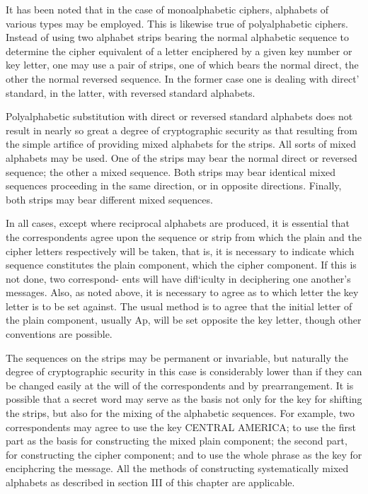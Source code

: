 \mypara It has been noted that in the case of monoalphabetic ciphers, alphabets of various types may be employed. This is likewise true of polyalphabetic ciphers. Instead of using two alphabet strips bearing the
normal alphabetic sequence to determine the cipher equivalent of a letter
enciphered by a given key number or key letter, one may use a pair of
strips, one of which bears the normal direct, the other the normal reversed
sequence. In the former case one is dealing with direct' standard, in the
latter, with reversed standard alphabets.

\mypara Polyalphabetic substitution with direct or reversed standard alphabets does not result in nearly so great a degree of cryptographic security
as that resulting from the simple artiﬁce of providing mixed alphabets
for the strips. All sorts of mixed alphabets may be used. One of the
strips may bear the normal direct or reversed sequence; the other a
mixed sequence. Both strips may bear identical mixed sequences proceeding in the same direction, or in opposite directions. Finally, both strips
may bear different mixed sequences.

\mypara In all cases, except where reciprocal alphabets are produced, it is
essential that the correspondents agree upon the sequence or strip from
which the plain and the cipher letters respectively will be taken, that is,
it is necessary to indicate which sequence constitutes the plain component, which the cipher component. If this is not done, two correspond-
ents will have diﬂ‘iculty in deciphering one another’s messages. Also, as
noted above, it is necessary to agree as to which letter the key letter is to
be set against. The usual method is to agree that the initial letter of the
plain component, usually Ap, will be set opposite the key letter, though
other conventions are possible.

\mypara The sequences on the strips may be permanent or invariable, but
naturally the degree of cryptographic security in this case is considerably
lower than if they can be changed easily at the will of the correspondents
and by prearrangement. It is possible that a secret word may serve as
the basis not only for the key for shifting the strips, but also for the
mixing of the alphabetic sequences. For example, two correspondents
may agree to use the key CENTRAL AMERICA; to use the ﬁrst part
as the basis for constructing the mixed plain component; the second part,
for constructing the cipher component; and to use the whole phrase as
the key for enciphcring the message. All the methods of constructing systematically mixed alphabets as described in section III of this chapter
are applicable.

